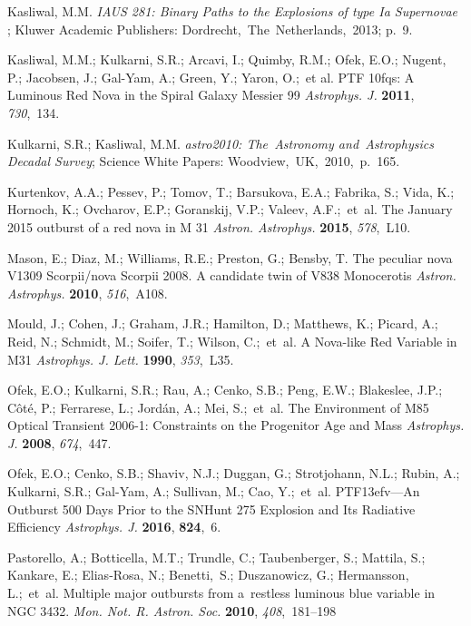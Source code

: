 \documentclass[galaxies,article,accept,moreauthors,pdftex]{mdpi}
\makeatletter
\let\jnl@style=\rmfamily
\def\ref@jnl#1{{\jnl@style#1}}%
\newcommand\apj{\ref@jnl{Astrophys. J.}}%
\newcommand\apjl{\ref@jnl{Astrophys. J. Lett.}}     %
\newcommand\aap{\ref@jnl{Astron. Astrophys.}}%
\makeatother
\begin{document}
\begin{thebibliography}{999}
 Kasliwal, M.M. {\em IAUS 281: Binary Paths to the Explosions of type Ia Supernovae }; Kluwer Academic Publishers: Dordrecht,~The~Netherlands,~2013; p.~9. 

 Kasliwal, M.M.; Kulkarni, S.R.; Arcavi, I.; Quimby, R.M.; Ofek, E.O.; Nugent, P.; Jacobsen, J.; Gal-Yam, A.; Green, Y.; Yaron, O.;~et al. PTF 10fqs: A Luminous Red Nova in the Spiral Galaxy Messier 99 {\em \apj} \textbf{2011}, \emph{730},~134.



 Kulkarni, S.R.; Kasliwal, M.M. {\em astro2010: The~Astronomy and~Astrophysics Decadal Survey}; Science White Papers: Woodview,~UK,~2010,~p.~165. 


 Kurtenkov, A.A.; Pessev, P.; Tomov, T.; Barsukova, E.A.; Fabrika, S.; Vida, K.; Hornoch, K.; Ovcharov, E.P.; Goranskij, V.P.; Valeev, A.F.;~et~al. The January 2015 outburst of a red nova in M 31 {\em \aap}
\textbf{2015}, \emph{578},~L10.





 Mason, E.; Diaz, M.; Williams, R.E.; Preston, G.; Bensby, T. The peculiar nova V1309 Scorpii/nova Scorpii 2008. A candidate twin of V838 Monocerotis {\em \aap}  \textbf{2010}, \emph{516},~A108.


 Mould, J.; Cohen, J.; Graham, J.R.; Hamilton, D.; Matthews, K.; Picard, A.; Reid, N.; Schmidt, M.; Soifer, T.; Wilson, C.;~et~al. A Nova-like Red Variable in M31 {\em \apjl} \textbf{1990}, \emph{353},~L35.



  Ofek, E.O.; Kulkarni, S.R.; Rau, A.; Cenko, S.B.; Peng, E.W.; Blakeslee, J.P.; Côté, P.; Ferrarese, L.; Jordán, A.; Mei, S.;~et~al. The Environment of M85 Optical Transient 2006-1: Constraints on the Progenitor Age and Mass {\em \apj} \textbf{2008}, \emph{674},~447.


 Ofek, E.O.; Cenko, S.B.; Shaviv, N.J.; Duggan, G.; Strotjohann, N.L.; Rubin, A.; Kulkarni, S.R.; Gal-Yam, A.; Sullivan, M.; Cao, Y.;~et~al. PTF13efv—An Outburst 500 Days Prior to the SNHunt 275 Explosion and Its Radiative Efficiency {\em \apj} \textbf{2016}, \textbf{824},~6.
 

 Pastorello, A.; Botticella, M.T.; Trundle, C.; Taubenberger, S.; Mattila, S.; Kankare, E.; Elias-Rosa, N.; Benetti,~S.; Duszanowicz, G.; Hermansson, L.;~et~al. Multiple major outbursts from a~restless luminous blue variable in NGC 3432. {\em Mon. Not. R. Astron. Soc.} \textbf{2010}, \emph{408},~181--198



\end{thebibliography}
\end{document}
